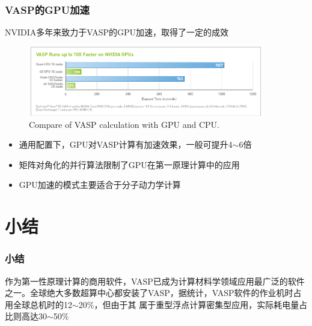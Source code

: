 \frame
{
	\frametitle{\textrm{VASP}的\textrm{GPU}加速}
\textrm{NVIDIA}多年来致力于\textrm{VASP}的\textrm{GPU}加速，取得了一定的成效
\begin{figure}[h!]
	\vspace{-0.15in}
\centering
\includegraphics[height=1.2in,width=4.05in,viewport=0 0 850 260,clip]{Figures/VASP-GPU-CPU.png}
\caption{\tiny \textrm{Compare of VASP calculation with GPU and CPU.}}%
\label{VASP_GPU}
\end{figure} 
\begin{itemize}
	\item 通用配置下，\textrm{GPU}对\textrm{VASP}计算有加速效果，一般可提升4$\sim$6倍
	\item 矩阵对角化的并行算法限制了\textrm{GPU}在第一原理计算中的应用
	\item \textrm{GPU}加速的模式主要适合于分子动力学计算
\end{itemize}
}

\section{小结}
\frame
{
	\frametitle{小结}
	作为第一性原理计算的商用软件，\textrm{VASP}已成为计算材料学领域应用最广泛的软件之一。全球绝大多数超算中心都安装了\textrm{VASP}，据统计，\textrm{VASP}软件的作业机时占用全球总机时的12$\sim$20\%，但由于其%
属于重型浮点计算密集型应用，实际耗电量占比则高达30$\sim$50\%
\vskip 3pt
	{\fontsize{9.0pt}{7.2pt}}
}
